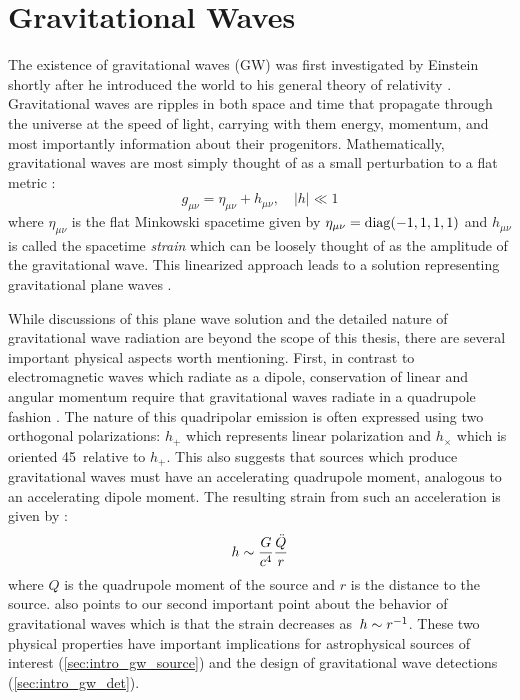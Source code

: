 \section{Gravitational Waves}
\label{sec:intro_gw}
The existence of gravitational waves (GW) was first investigated by Einstein shortly after he introduced the world to his general theory of relativity \citep{Einstein1915,Einstein1916,Einstein1918}. Gravitational waves are ripples in both space and time that propagate through the universe at the speed of light, carrying with them energy, momentum, and most importantly information about their progenitors. Mathematically, gravitational waves are most simply thought of as a small perturbation to a flat metric \citep[$g_{\mu\nu}$; ][]{Misner+73,Carroll2004}:
\begin{equation}
\label{eq:intro_metric}
g_{\mu\nu} = \eta_{\mu\nu} + h_{\mu\nu}, \quad |h| \ll 1
\end{equation}
\noindent where $\eta_{\mu\nu}$ is the flat Minkowski spacetime given by $\eta_{\mu\nu} = {\rm diag}(-1, 1,1,1)$ and $h_{\mu\nu}$ is called the spacetime {\em strain} which can be loosely thought of as the amplitude of the gravitational wave. This linearized approach leads to a solution representing gravitational plane waves \citep[see e.g.,][and references therein]{Misner+73,Carroll2004}.

While discussions of this plane wave solution and the detailed nature of gravitational wave radiation are beyond the scope of this thesis, there are several important physical aspects worth mentioning. First, in contrast to electromagnetic waves which radiate as a dipole, conservation of linear and angular momentum require that gravitational waves radiate in a quadrupole fashion \citep[see e.g.,][and references therein]{Centrella+10}. The nature of this quadripolar emission is often expressed using two orthogonal polarizations: $h_{+}$ which represents linear polarization and $h_{\times}$ which is oriented 45\degr~relative to $h_{+}$. This also suggests that sources which produce gravitational waves must have an accelerating quadrupole moment, analogous to an accelerating dipole moment. The resulting strain  from such an acceleration is given by \citep{Centrella+10}:
\begin{equation}
\label{eq:intro_quad}
h \apx \frac{G}{c^4} \frac{\ddot{Q}}{r}
\end{equation}
\noindent where $Q$ is the quadrupole moment of the source and $r$ is the distance to the source.  also points to our second important point about the behavior of gravitational waves which is that the strain decreases as~$h \sim r^{-1}$. These two physical properties have important implications for astrophysical sources of interest (\cref{sec:intro_gw_source}) and the design of gravitational wave detections (\cref{sec:intro_gw_det}). 

